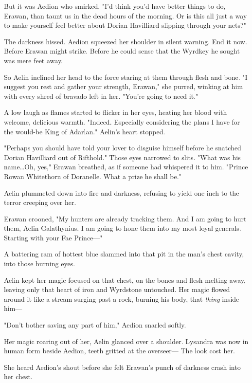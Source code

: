 But it was Aedion who smirked, "I'd think you'd have better things to do, Erawan, than taunt us in the dead hours of the morning.
Or is this all just a way to make yourself feel better about Dorian Havilliard slipping through your nets?"

The darkness hissed.
Aedion squeezed her shoulder in silent warning.
End it now.
Before Erawan might strike.
Before he could sense that the Wyrdkey he sought was mere feet away.

So Aelin inclined her head to the force staring at them through flesh and bone.
"I suggest you rest and gather your strength, Erawan," she purred, winking at him with every shred of bravado left in her.
"You're going to need it."

A low laugh as flames started to flicker in her eyes, heating her blood with welcome, delicious warmth.
"Indeed.
Especially considering the plans I have for the would-be King of Adarlan."
Aelin's heart stopped.

"Perhaps you should have told your lover to disguise himself before he snatched Dorian Havilliard out of Rifthold."
Those eyes narrowed to slits.
"What was his name\ldots Oh, yes," Erawan breathed, as if someone had whispered it to him.
"Prince Rowan Whitethorn of Doranelle.
What a prize he shall be."

Aelin plummeted down into fire and darkness, refusing to yield one inch to the terror creeping over her.

Erawan crooned, "My hunters are already tracking them.
And I am going to hurt them, Aelin Galathynius.
I am going to hone them into my most loyal generals.
Starting with your Fae Prince---"

A battering ram of hottest blue slammed into that pit in the man's chest cavity, into those burning eyes.

Aelin kept her magic focused on that chest, on the bones and flesh melting away, leaving only that heart of iron and Wyrdstone untouched.
Her magic flowed around it like a stream surging past a rock, burning his body, that \emph{thing} inside him---

"Don't bother saving any part of him," Aedion snarled softly.

Her magic roaring out of her, Aelin glanced over a shoulder.
Lysandra was now in human form beside Aedion, teeth gritted at the overseer--- The look cost her.

She heard Aedion's shout before she felt Erawan's punch of darkness crash into her chest.

